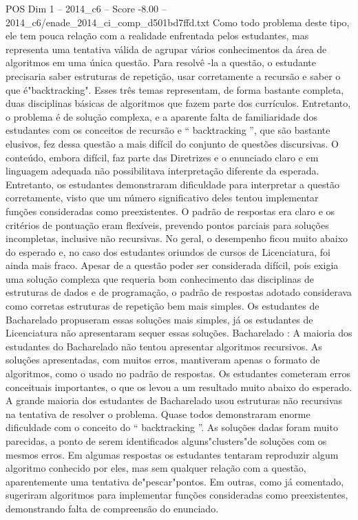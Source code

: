 \begin{textsample}{POS Dim 1 – 2014\_c6 – Score -8.00 – 2014\_c6/enade\_2014\_ci\_comp\_d501bd7ffd.txt}
Como todo problema deste tipo, ele tem pouca relação com a realidade enfrentada pelos estudantes, mas representa uma tentativa válida de agrupar vários conhecimentos da área de algoritmos em uma única questão.
Para resolvê -la a questão, o estudante precisaria saber estruturas de repetição, usar corretamente a recursão e saber o que é"backtracking".
Esses três temas representam, de forma bastante completa, duas disciplinas básicas de algoritmos que fazem parte dos currículos.
Entretanto, o problema é de solução complexa, e a aparente falta de familiaridade dos estudantes com os conceitos de recursão e “ backtracking ”, que são bastante elusivos, fez dessa questão a mais difícil do conjunto de questões discursivas.
O conteúdo, embora difícil, faz parte das Diretrizes e o enunciado claro e em linguagem adequada não possibilitava interpretação diferente da esperada.
Entretanto, os estudantes demonstraram dificuldade para interpretar a questão corretamente, visto que um número significativo deles tentou implementar funções consideradas como preexistentes.
O padrão de respostas era claro e os critérios de pontuação eram flexíveis, prevendo pontos parciais para soluções incompletas, inclusive não recursivas.
No geral, o desempenho ficou muito abaixo do esperado e, no caso dos estudantes oriundos de cursos de Licenciatura, foi ainda mais fraco.
Apesar de a questão poder ser considerada difícil, pois exigia uma solução complexa que requeria bom conhecimento das disciplinas de estruturas de dados e de programação, o padrão de respostas adotado considerava como corretas estruturas de repetição bem mais simples.
Os estudantes de Bacharelado propuseram essas soluções mais simples, já os estudantes de Licenciatura não apresentaram sequer essas soluções.
Bacharelado : A maioria dos estudantes do Bacharelado não tentou apresentar algoritmos recursivos.
As soluções apresentadas, com muitos erros, mantiveram apenas o formato de algoritmos, como o usado no padrão de respostas.
Os estudantes cometeram erros conceituais importantes, o que os levou a um resultado muito abaixo do esperado.
A grande maioria dos estudantes de Bacharelado usou estruturas não recursivas na tentativa de resolver o problema.
Quase todos demonstraram enorme dificuldade com o conceito do “ backtracking ”.
As soluções dadas foram muito parecidas, a ponto de serem identificados alguns"clusters"de soluções com os mesmos erros.
Em algumas respostas os estudantes tentaram reproduzir algum algoritmo conhecido por eles, mas sem qualquer relação com a questão, aparentemente uma tentativa de"pescar"pontos.
Em outras, como já comentado, sugeriram algoritmos para implementar funções consideradas como preexistentes, demonstrando falta de compreensão do enunciado.

\end{textsample}
